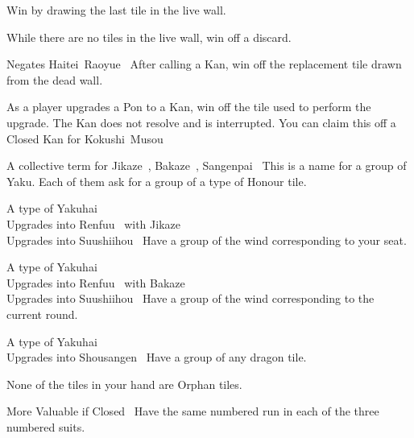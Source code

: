 	{}
	{Win by drawing the last tile in the live wall.}

	{}
	{While there are no tiles in the live wall, win off a discard.}

	{\symbnegate Negates Haitei~Raoyue~}
	{After calling a Kan, win off the replacement tile drawn from the dead wall.}

	{}
	{As a player upgrades a Pon to a Kan, win off the tile used to perform the upgrade. The Kan does not resolve and is interrupted. You can claim this off a Closed Kan for Kokushi~Musou~}

	{\upgradesto A collective term for Jikaze~, Bakaze~, Sangenpai~}
	{This is a name for a group of Yaku. Each of them ask for a group of a type of Honour tile.}

	{\upgradesfrom A type of Yakuhai~\\
	\upgradesto Upgrades into Renfuu~ with Jikaze~\\
	\upgradesto Upgrades into Suushiihou~}
	{Have a group of the wind corresponding to your seat.}

	{\upgradesfrom A type of Yakuhai~\\
	\upgradesto Upgrades into Renfuu~ with Bakaze~\\
	\upgradesto Upgrades into Suushiihou~}
	{Have a group of the wind corresponding to the current round.}

	{\upgradesfrom A type of Yakuhai~\\
	\upgradesto Upgrades into Shousangen~}
	{Have a group of any dragon tile.}

	{}
	{None of the tiles in your hand are Orphan tiles.}

	{\morevaluable More Valuable if Closed~}
	{Have the same numbered run in each of the three numbered suits.}

